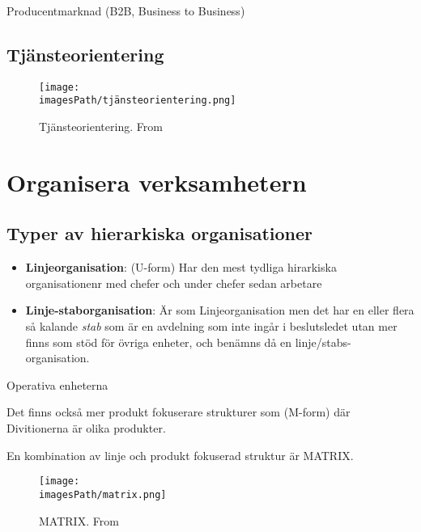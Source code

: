Producentmarknad (B2B, Business to Business)

\subsection{Tjänsteorientering}
\begin{figure}[!ht]
    \centering
    \texttt{[image: \\imagesPath/tjänsteorientering.png]}
    \caption{Tjänsteorientering. From \cite{}}
\end{figure}


\section{Organisera verksamhetern}
\subsection{Typer av hierarkiska organisationer}
\begin{itemize}
    \item \textbf{Linjeorganisation}: (U-form) \newline
    Har den mest tydliga hirarkiska organisationenr med chefer och under chefer sedan arbetare
    \item \textbf{Linje-staborganisation}: \newline
    Är som Linjeorganisation men det har en eller flera så kalande \textit{stab} som 
    är en avdelning som inte ingår i beslutsledet utan mer finns som stöd för övriga enheter, och benämns
    då en linje/stabs-organisation.
\end{itemize}
Operativa enheterna

Det finns också mer produkt fokuserare strukturer som (M-form)
där Divitionerna är olika produkter.

En kombination av linje och produkt fokuserad struktur är MATRIX.
\begin{figure}[!ht]
    \centering
    \texttt{[image: \\imagesPath/matrix.png]}
    \caption{MATRIX. From \cite{}}
\end{figure}


